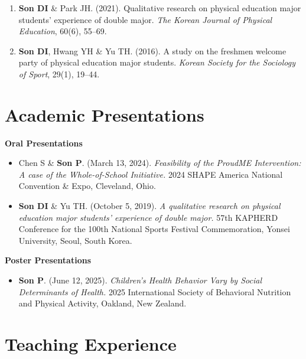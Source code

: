 \documentclass[11pt, letterpaper]{article}
\begin{document}
\begin{enumerate}[leftmargin=*, label=\arabic*., itemsep=4pt]
  \item \textbf{Son DI} \& Park JH. (2021). Qualitative research on physical education major students' experience of double major. \textit{The Korean Journal of Physical Education}, 60(6), 55--69.

  \item \textbf{Son DI}, Hwang YH \& Yu TH. (2016). A study on the freshmen welcome party of physical education major students. \textit{Korean Society for the Sociology of Sport}, 29(1), 19--44.

\end{enumerate}

\section{Academic Presentations}

\textbf{Oral Presentations}

\begin{itemize}[leftmargin=*, itemsep=3pt]
  \item Chen S \& \textbf{Son P}. (March 13, 2024). \textit{Feasibility of the ProudME Intervention: A case of the Whole-of-School Initiative.} 2024 SHAPE America National Convention \& Expo, Cleveland, Ohio.

  \item \textbf{Son DI} \& Yu TH. (October 5, 2019). \textit{A qualitative research on physical education major students' experience of double major.} 57th KAPHERD Conference for the 100th National Sports Festival Commemoration, Yonsei University, Seoul, South Korea.
\end{itemize}

\vspace{4pt}
\textbf{Poster Presentations}

\begin{itemize}[leftmargin=*, itemsep=3pt]
  \item \textbf{Son P}. (June 12, 2025). \textit{Children's Health Behavior Vary by Social Determinants of Health.} 2025 International Society of Behavioral Nutrition and Physical Activity, Oakland, New Zealand.
\end{itemize}

\section{Teaching Experience}
\end{document}
